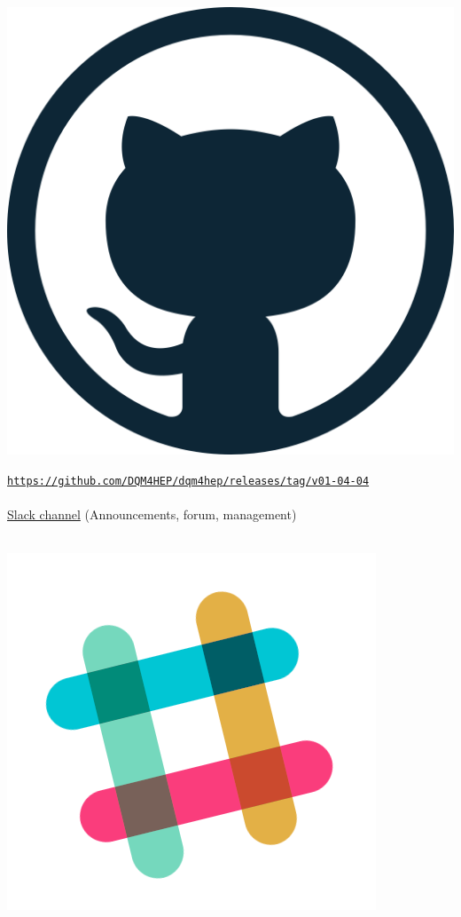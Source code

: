 \documentclass[presentation, 10pt]{beamer}
\begin{document}
\begin{frame}
\begin{minipage}{0.03\linewidth}
    \includegraphics[width=\linewidth]{figs/github-logo.png}
  \end{minipage}
  \href{https://github.com/DQM4HEP/dqm4hep/releases/tag/v01-04-04}{\tt https://github.com/DQM4HEP/dqm4hep/releases/tag/v01-04-04} \\
  ~\\
  \underline{Slack channel} (Announcements, forum, management) \\
  \vspace*{0.1cm}
  ~~~
  \begin{minipage}{0.035\linewidth}
    \includegraphics[width=\linewidth]{figs/slack-logo.png}

\end{minipage}
\end{frame}
\end{document}
